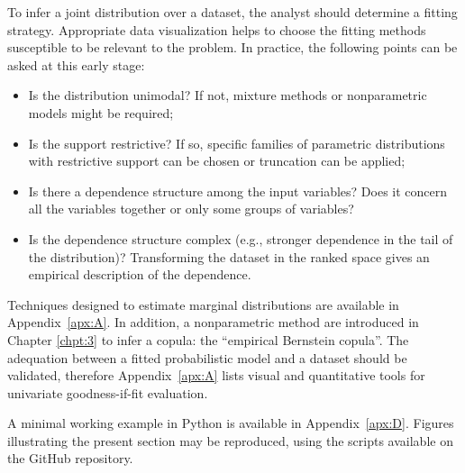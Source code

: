 To infer a joint distribution over a dataset, the analyst should determine a fitting strategy. 
Appropriate data visualization helps to choose the fitting methods susceptible to be relevant to the problem. 
In practice, the following points can be asked at this early stage:
\begin{itemize}
    \item Is the distribution unimodal? If not, mixture methods or nonparametric models might be required;
    \item Is the support restrictive? If so, specific families of parametric distributions with restrictive support can be chosen or truncation can be applied;
    \item Is there a dependence structure among the input variables? Does it concern all the variables together or only some groups of variables? 
    \item Is the dependence structure complex (e.g., stronger dependence in the tail of the distribution)? Transforming the dataset in the ranked space gives an empirical description of the dependence. 
\end{itemize} 

Techniques designed to estimate marginal distributions are available in Appendix~\ref{apx:A}. 
In addition, a nonparametric method are introduced in Chapter \ref{chpt:3} to infer a copula: the ``empirical Bernstein copula''. 
The adequation between a fitted probabilistic model and a dataset should be validated, therefore Appendix~\ref{apx:A} lists visual and quantitative tools for univariate goodness-if-fit evaluation.


\begin{otexample}
    A minimal working example in Python is available in Appendix~\ref{apx:D}. 
    Figures illustrating the present section may be reproduced, using the \ots scripts available on the GitHub repository\footnotemark. 
\end{otexample}

